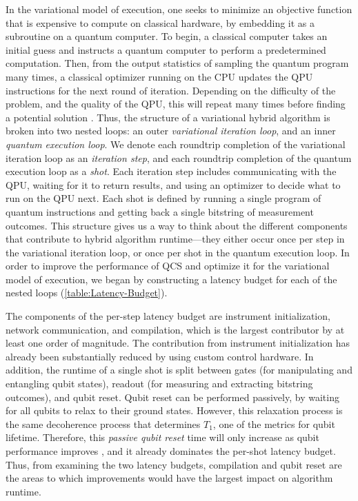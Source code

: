 \documentclass[12pt]{iopart}
\begin{document}
In the variational model of execution, one seeks to minimize an objective function that is expensive to compute on classical hardware, by embedding it as a subroutine on a quantum computer. To begin, a classical computer takes an initial guess and instructs a quantum computer to perform a predetermined computation. Then, from the output statistics of sampling the quantum program many times, a classical optimizer running on the CPU updates the QPU instructions for the next round of iteration. Depending on the difficulty of the problem, and the quality of the QPU, this will repeat many times before finding a potential solution \cite{McCleanBarrenPlateaus}. Thus, the structure of a variational hybrid algorithm is broken into two nested loops: an outer \textit{variational iteration loop}, and an inner \textit{quantum execution loop}. We denote each roundtrip completion of the variational iteration loop as an \textit{iteration step}, and each roundtrip completion of the quantum execution loop as a \textit{shot}. Each iteration step includes communicating with the QPU, waiting for it to return results, and using an optimizer to decide what to run on the QPU next. Each shot is defined by running a single program of quantum instructions and getting back a single bitstring of measurement outcomes. This structure gives us a way to think about the different components that contribute to hybrid algorithm runtime---they either occur once per step in the variational iteration loop, or once per shot in the quantum execution loop. In order to improve the performance of QCS and optimize it for the variational model of execution, we began by constructing a latency budget for each of the nested loops (\cref{table:Latency-Budget}). 

The components of the per-step latency budget are instrument initialization, network communication, and compilation, which is the largest contributor by at least one order of magnitude. The contribution from instrument initialization has already been substantially reduced by using custom control hardware. In addition, the runtime of a single shot is split between gates (for manipulating and entangling qubit states), readout (for measuring and extracting bitstring outcomes), and qubit reset. Qubit reset can be performed passively, by waiting for all qubits to relax to their ground states. However, this relaxation process is the same decoherence process that determines $T_1$, one of the metrics for qubit lifetime. Therefore, this \textit{passive qubit reset} time will only increase as qubit performance improves \cite{RigettiFabT1, GyensisZeroPi}, and it already dominates the per-shot latency budget. Thus, from examining the two latency budgets, compilation and qubit reset are the areas to which improvements would have the largest impact on algorithm runtime.
\end{document}
